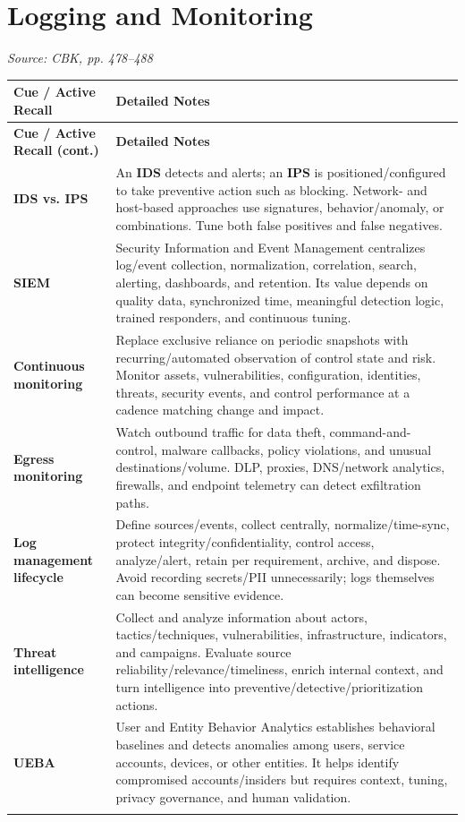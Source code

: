 \documentclass[10pt,letterpaper]{article}
\makeatletter
\newenvironment{cornell}{\rowcolors{2}{white}{notebg}\begin{longtable}{@{}>{\raggedright\arraybackslash\columncolor{cuebg}\color{navy}\bfseries}p{0.285\textwidth}>{\raggedright\arraybackslash}p{0.65\textwidth}@{}}\rowcolor{navy}\color{white}\textbf{Cue / Active Recall} & \color{white}\textbf{Detailed Notes}\\ \hline\endfirsthead\rowcolor{navy}\color{white}\textbf{Cue / Active Recall (cont.)} & \color{white}\textbf{Detailed Notes}\\ \hline\endhead}{\end{longtable}}
\newcommand{\noterow}[2]{#1 & #2\\\arrayrulecolor{line}\hline}\newcommand{\source}[1]{\par{\footnotesize\color{teal}\textit{Source: CBK, #1}}\par}
\makeatother
\begin{document}
\section{\color{navy}Logging and Monitoring}
\source{pp. 478--488}
\begin{cornell}
\noterow{IDS vs. IPS}{An \textbf{IDS} detects and alerts; an \textbf{IPS} is positioned/configured to take preventive action such as blocking. Network- and host-based approaches use signatures, behavior/anomaly, or combinations. Tune both false positives and false negatives.}
\noterow{SIEM}{Security Information and Event Management centralizes log/event collection, normalization, correlation, search, alerting, dashboards, and retention. Its value depends on quality data, synchronized time, meaningful detection logic, trained responders, and continuous tuning.}
\noterow{Continuous monitoring}{Replace exclusive reliance on periodic snapshots with recurring/automated observation of control state and risk. Monitor assets, vulnerabilities, configuration, identities, threats, security events, and control performance at a cadence matching change and impact.}
\noterow{Egress monitoring}{Watch outbound traffic for data theft, command-and-control, malware callbacks, policy violations, and unusual destinations/volume. DLP, proxies, DNS/network analytics, firewalls, and endpoint telemetry can detect exfiltration paths.}
\noterow{Log management lifecycle}{Define sources/events, collect centrally, normalize/time-sync, protect integrity/confidentiality, control access, analyze/alert, retain per requirement, archive, and dispose. Avoid recording secrets/PII unnecessarily; logs themselves can become sensitive evidence.}
\noterow{Threat intelligence}{Collect and analyze information about actors, tactics/techniques, vulnerabilities, infrastructure, indicators, and campaigns. Evaluate source reliability/relevance/timeliness, enrich internal context, and turn intelligence into preventive/detective/prioritization actions.}
\noterow{UEBA}{User and Entity Behavior Analytics establishes behavioral baselines and detects anomalies among users, service accounts, devices, or other entities. It helps identify compromised accounts/insiders but requires context, tuning, privacy governance, and human validation.}
\end{cornell}
\end{document}
